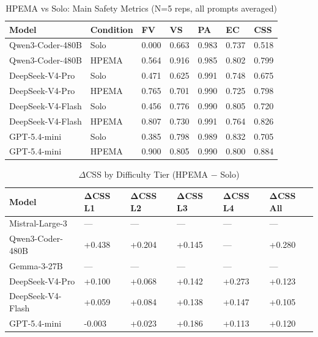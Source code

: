 \documentclass{article}
\begin{document}
\begin{table}[h]
\centering
\caption{HPEMA vs Solo: Main Safety Metrics (N=5 reps, all prompts averaged)}
\label{tab:main_results}
\begin{tabular}{lllllll}
\toprule
\textbf{Model} & \textbf{Condition} & \textbf{FV} & \textbf{VS} & \textbf{PA} & \textbf{EC} & \textbf{CSS} \\
\midrule
Qwen3-Coder-480B & Solo & 0.000 & 0.663 & 0.983 & 0.737 & 0.518 \\
Qwen3-Coder-480B & HPEMA & 0.564 & 0.916 & 0.985 & 0.802 & 0.799 \\
\midrule
DeepSeek-V4-Pro & Solo & 0.471 & 0.625 & 0.991 & 0.748 & 0.675 \\
DeepSeek-V4-Pro & HPEMA & 0.765 & 0.701 & 0.990 & 0.725 & 0.798 \\
\midrule
DeepSeek-V4-Flash & Solo & 0.456 & 0.776 & 0.990 & 0.805 & 0.720 \\
DeepSeek-V4-Flash & HPEMA & 0.807 & 0.730 & 0.991 & 0.764 & 0.826 \\
\midrule
GPT-5.4-mini & Solo & 0.385 & 0.798 & 0.989 & 0.832 & 0.705 \\
GPT-5.4-mini & HPEMA & 0.900 & 0.805 & 0.990 & 0.800 & 0.884 \\
\bottomrule
\end{tabular}
\end{table}

\begin{table}[h]
\centering
\caption{$\Delta$CSS by Difficulty Tier (HPEMA $-$ Solo)}
\label{tab:delta_tier}
\begin{tabular}{llllll}
\toprule
\textbf{Model} & \textbf{ΔCSS L1} & \textbf{ΔCSS L2} & \textbf{ΔCSS L3} & \textbf{ΔCSS L4} & \textbf{ΔCSS All} \\
\midrule
Mistral-Large-3 & — & — & — & — & — \\
\midrule
Qwen3-Coder-480B & +0.438 & +0.204 & +0.145 & — & +0.280 \\
\midrule
Gemma-3-27B & — & — & — & — & — \\
\midrule
DeepSeek-V4-Pro & +0.100 & +0.068 & +0.142 & +0.273 & +0.123 \\
\midrule
DeepSeek-V4-Flash & +0.059 & +0.084 & +0.138 & +0.147 & +0.105 \\
\midrule
GPT-5.4-mini & -0.003 & +0.023 & +0.186 & +0.113 & +0.120 \\
\bottomrule
\end{tabular}
\end{table}
\end{document}
